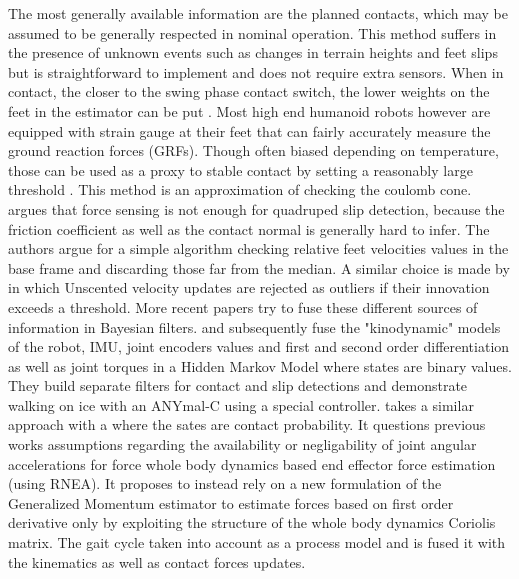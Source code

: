 The most generally available information are the planned contacts, which may be assumed to be generally respected in nominal operation. 
This method suffers in the presence of unknown events such as changes in terrain heights and feet slips but is straightforward to implement and 
does not require extra sensors. When in contact, the closer to the swing phase contact switch, the lower weights on the feet in the estimator can be put \cite{leziart2021implementation, bledt2018contact}. 
Most high end humanoid robots however \cite{stasse2017talos, englsberger2014overview} are equipped with strain gauge at their feet that can fairly accurately measure the ground reaction forces (GRFs). 
Though often biased depending on temperature, those can be used as a proxy to stable contact by setting a reasonably large threshold \cite{fallon2014drift}. 
This method is an approximation of checking the coulomb cone.
\cite{Focchi2015SlipDA} argues that force sensing is not enough for quadruped slip detection, because the friction coefficient
as well as the contact normal is generally hard to infer. The authors argue for a simple algorithm checking relative feet velocities values in the base frame and discarding those
far from the median. A similar choice is made by \cite{bloesch2013stateSlippery} in which Unscented \KalmanF velocity updates are rejected as outliers if their innovation exceeds a threshold.  
More recent papers try to fuse these different sources of information in Bayesian filters. \cite{hwangbo2016probabilistic} and subsequently \cite{jenelten2019dynamic} fuse 
the  "kinodynamic" models of the robot, IMU, joint encoders values and first and second order differentiation as well as
joint torques in a Hidden Markov Model where states are binary values. They build separate filters for contact and slip detections and demonstrate walking on ice with an ANYmal-C using a special controller.
\cite{bledt2018contact} takes a similar approach with a \KalmanF where the sates are contact probability. It questions previous works assumptions regarding the availability 
\cite{hwangbo2016probabilistic} or negligability \cite{camurri2017probabilistic} of joint angular accelerations for force whole body dynamics based end effector force estimation (using RNEA).
It proposes to instead rely on a new formulation of the Generalized Momentum estimator to estimate forces based on first order derivative only by exploiting the 
structure of the whole body dynamics Coriolis matrix. The gait cycle taken into account as a process model and is fused it with the kinematics as well as contact forces updates.  

